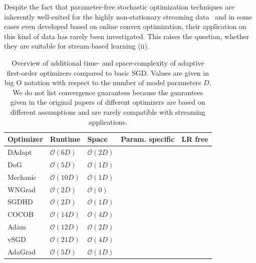 \documentclass[letterpaper]{article} %
\newcommand{\cmark}{\ding{51}} %
\newcommand{\xmark}{\ding{55}} %
\begin{document}
Despite the fact that parameter-free stochastic optimization techniques are inherently well-suited for the highly non-stationary streaming data~\cite{schaulNoMorePesky2013} and in some cases even developed based on online convex optimization, their application on this kind of data has rarely been investigated.
This raises the question, whether they are suitable for stream-based learning (ii).


\begin{table}[ht]
	\centering
	\small
	\begin{tabular}{@{}lllcc@{}}
		\toprule
		Optimizer & Runtime                         & Space             & Param. specific & LR free \\ \midrule
		DAdapt    & $\mathcal{O}(6D)$               & $\mathcal{O}(2D)$ & \xmark          & \cmark  \\
		DoG       & $\mathcal{O}(5D)$               & $\mathcal{O}(1D)$ & \xmark          & \cmark  \\
		Mechanic  & $\mathcal{O}(10D)$              & $\mathcal{O}(1D)$ & \xmark          & \cmark  \\
		WNGrad    & $\mathcal{O}(2D)$               & $\mathcal{O}(0)$  & \xmark          & \cmark  \\
		SGDHD     & $\mathcal{O}(2D)$               & $\mathcal{O}(1D)$ & \xmark          & \cmark  \\
		COCOB     & $\mathcal{O}(14D)$              & $\mathcal{O}(4D)$ & \cmark          & \cmark  \\
		Adam      & $\mathcal{O}(12D)$              & $\mathcal{O}(2D)$ & \cmark          & \xmark  \\
		vSGD      & $\mathcal{O}(21D)$\footnotemark & $\mathcal{O}(4D)$ & \cmark          & \cmark  \\ %
		AdaGrad   & $\mathcal{O}(5D)$               & $\mathcal{O}(1D)$ & \cmark          & \xmark  \\ \bottomrule
	\end{tabular}
	\caption{Overview of additional time- and space-complexity of adaptive first-order optimizers compared to basic SGD. Values are given in big O notation with respect to the number of model parameters $D$. We do not list convergence guarantees because the guarantees given in the original papers of different optimizers are based on different assumptions and are rarely compatible with streaming applications.}\label{tab:param_free_optims}
\end{table}
\end{document}
